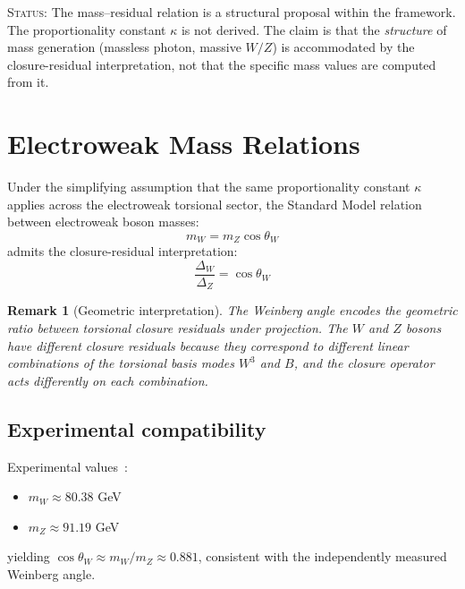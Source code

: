\documentclass[12pt]{article}
\newtheorem{remark}[theorem]{Remark}
\begin{document}
\textsc{Status:} The mass--residual relation is a structural proposal within the framework. The proportionality constant $\kappa$ is not derived. The claim is that the \textit{structure} of mass generation (massless photon, massive $W/Z$) is accommodated by the closure-residual interpretation, not that the specific mass values are computed from it.

\section{Electroweak Mass Relations}\label{sec:massrelation}

Under the simplifying assumption that the same proportionality constant $\kappa$ applies across the electroweak torsional sector, the Standard Model relation between electroweak boson masses:
\begin{equation}\label{eq:mwmz}
    m_W = m_Z \cos\theta_W
\end{equation}
admits the closure-residual interpretation:
\begin{equation}\label{eq:defectratio}
    \frac{\Delta_W}{\Delta_Z} = \cos\theta_W
\end{equation}

\begin{remark}[Geometric interpretation]
The Weinberg angle encodes the geometric ratio between torsional closure residuals under projection. The $W$ and $Z$ bosons have different closure residuals because they correspond to different linear combinations of the torsional basis modes $W^3$ and $B$, and the closure operator acts differently on each combination.
\end{remark}

\subsection{Experimental compatibility}

Experimental values~\citep{Workman2022}:
\begin{itemize}
    \item $m_W \approx 80.38$ GeV
    \item $m_Z \approx 91.19$ GeV
\end{itemize}

yielding $\cos\theta_W \approx m_W/m_Z \approx 0.881$, consistent with the independently measured Weinberg angle.
\end{document}
